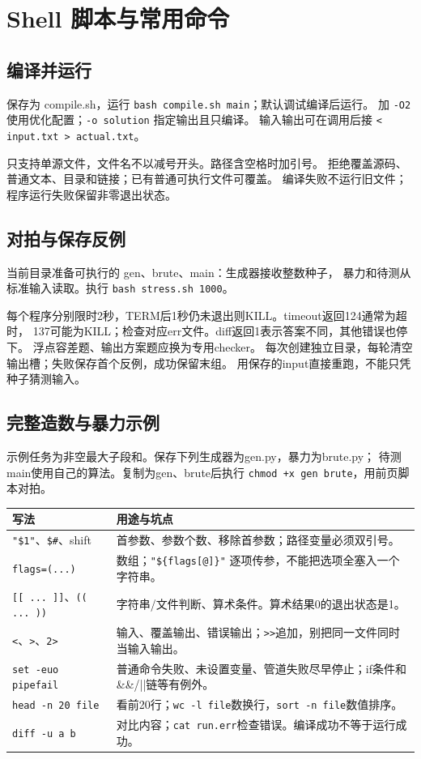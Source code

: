 \chapter{Shell 脚本与常用命令}
\section{编译并运行}
保存为 compile.sh，运行 \texttt{bash compile.sh main}；默认调试编译后运行。
加 \texttt{-O2} 使用优化配置；\texttt{-o solution} 指定输出且只编译。
输入输出可在调用后接 \texttt{< input.txt > actual.txt}。

只支持单源文件，文件名不以减号开头。路径含空格时加引号。
拒绝覆盖源码、普通文本、目录和链接；已有普通可执行文件可覆盖。
编译失败不运行旧文件；程序运行失败保留非零退出状态。

\newpage
\section{对拍与保存反例}
当前目录准备可执行的 gen、brute、main：生成器接收整数种子，
暴力和待测从标准输入读取。执行 \texttt{bash stress.sh 1000}。

每个程序分别限时2秒，TERM后1秒仍未退出则KILL。timeout返回124通常为超时，
137可能为KILL；检查对应err文件。diff返回1表示答案不同，其他错误也停下。
浮点容差题、输出方案题应换为专用checker。
每次创建独立目录，每轮清空输出槽；失败保存首个反例，成功保留末组。
用保存的input直接重跑，不能只凭种子猜测输入。

\newpage
\section{完整造数与暴力示例}
示例任务为非空最大子段和。保存下列生成器为gen.py，暴力为brute.py；
待测main使用自己的算法。复制为gen、brute后执行
\texttt{chmod +x gen brute}，用前页脚本对拍。


\begin{longtable}{p{47mm}p{112mm}}\toprule 写法 & 用途与坑点\\\midrule\endhead
\texttt{"\$1"}、\texttt{\$\#}、shift & 首参数、参数个数、移除首参数；路径变量必须双引号。\\
\texttt{flags=(...)} & 数组；\texttt{"\$\{flags[@]\}"} 逐项传参，不能把选项全塞入一个字符串。\\
\texttt{[[ ... ]]}、\texttt{(( ... ))} & 字符串/文件判断、算术条件。算术结果0的退出状态是1。\\
\texttt{<}、\texttt{>}、\texttt{2>} & 输入、覆盖输出、错误输出；\texttt{>>}追加，别把同一文件同时当输入输出。\\
\texttt{set -euo pipefail} & 普通命令失败、未设置变量、管道失败尽早停止；if条件和\&\&/||链等有例外。\\
\texttt{head -n 20 file} & 看前20行；\texttt{wc -l file}数换行，\texttt{sort -n file}数值排序。\\
\texttt{diff -u a b} & 对比内容；\texttt{cat run.err}检查错误。编译成功不等于运行成功。\\\bottomrule
\end{longtable}
